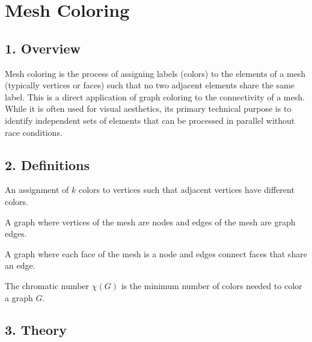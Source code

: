 \section{Mesh Coloring}
\label{sec:mesh_coloring}

\subsection{1. Overview}

Mesh coloring is the process of assigning labels (colors) to the elements of a mesh (typically vertices or faces) such that no two adjacent elements share the same label. This is a direct application of graph coloring to the connectivity of a mesh. While it is often used for visual aesthetics, its primary technical purpose is to identify independent sets of elements that can be processed in parallel without race conditions.

\subsection{2. Definitions}

\begin{definition}[$k$-Coloring]\label{def:k_coloring}
An assignment of $k$ colors to vertices such that adjacent vertices have different colors.
\end{definition}

\begin{definition}\label{def:vertex_graph}
A graph where vertices of the mesh are nodes and edges of the mesh are graph edges.
\end{definition}

\begin{definition}\label{def:dual_graph_coloring}
A graph where each face of the mesh is a node and edges connect faces that share an edge.
\end{definition}

\begin{definition}\label{def:chromatic_number}
The chromatic number $\chi(G)$ is the minimum number of colors needed to color a graph $G$.
\end{definition}

\subsection{3. Theory}

